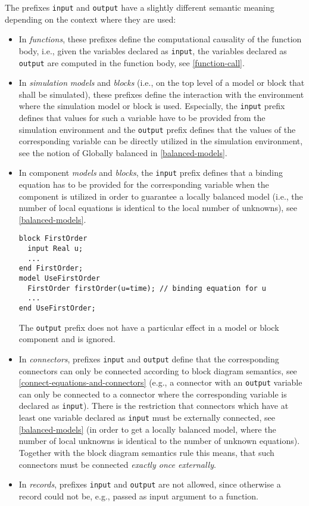 The prefixes \lstinline!input! and \lstinline!output! have a slightly different semantic meaning
depending on the context where they are used:
\begin{itemize}
\item
  In \emph{functions}, these prefixes define the computational causality
  of the function body, i.e., given the variables declared as \lstinline!input!, the
  variables declared as \lstinline!output! are computed in the function body, see
  \cref{function-call}.
\item
  In \emph{simulation} \emph{models} and \emph{blocks} (i.e., on the top
  level of a model or block that shall be simulated), these prefixes
  define the interaction with the environment where the simulation model
  or block is used. Especially, the \lstinline!input! prefix defines that values for
  such a variable have to be provided from the simulation environment
  and the \lstinline!output! prefix defines that the values of the corresponding
  variable can be directly utilized in the simulation environment, see
  the notion of Globally balanced in \cref{balanced-models}.
\item
  In component \emph{models} and \emph{blocks}, the \lstinline!input! prefix defines
  that a binding equation has to be provided for the corresponding
  variable when the component is utilized in order to guarantee a
  locally balanced model (i.e., the number of local equations is
  identical to the local number of unknowns), see \cref{balanced-models}.
\begin{example}
\begin{lstlisting}[language=modelica]
block FirstOrder
  input Real u;
  ...
end FirstOrder;
model UseFirstOrder
  FirstOrder firstOrder(u=time); // binding equation for u
  ...
end UseFirstOrder;
\end{lstlisting}
\end{example}
  The \lstinline!output! prefix does not have a particular effect in a model or block
  component and is ignored.
\item
  In \emph{connectors}, prefixes \lstinline!input! and \lstinline!output! define that the
  corresponding connectors can only be connected according to block
  diagram semantics, see \cref{connect-equations-and-connectors} (e.g., a connector with an \lstinline!output!
  variable can only be connected to a connector where the corresponding
  variable is declared as \lstinline!input!). There is the restriction that
  connectors which have at least one variable declared as \lstinline!input! must be
  externally connected, see \cref{balanced-models} (in order to get a locally
  balanced model, where the number of local unknowns is identical to the
  number of unknown equations). Together with the block diagram
  semantics rule this means, that such connectors must be connected
  \emph{exactly once externally}.
\item
  In \emph{records}, prefixes \lstinline!input! and \lstinline!output! are not allowed, since
  otherwise a record could not be, e.g., passed as input argument to a
  function.
\end{itemize}

